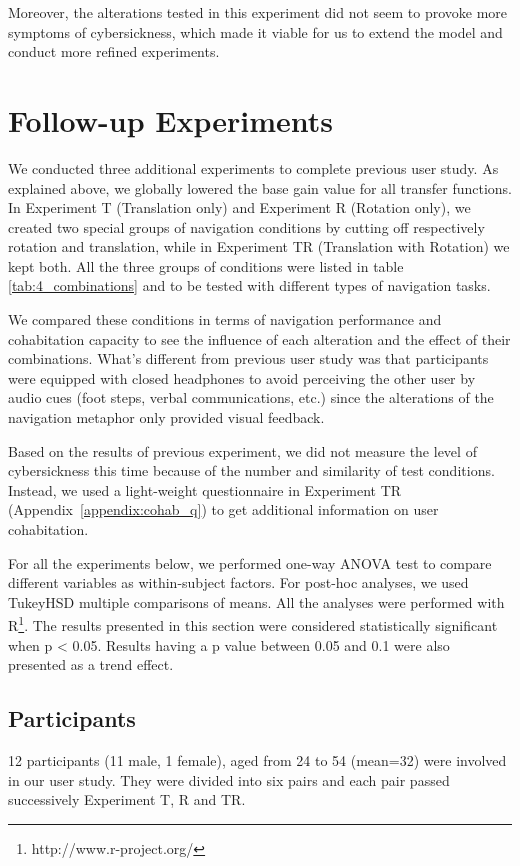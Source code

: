 Moreover, the alterations tested in this experiment did not seem to provoke more symptoms of cybersickness, which made it viable for us to extend the model and conduct more refined experiments.




\section{Follow-up Experiments}
We conducted three additional experiments to complete previous user study. As explained above, we globally lowered the base gain value for all transfer functions. In Experiment T (Translation only) and Experiment R (Rotation only), we created two special groups of navigation conditions by cutting off respectively rotation and translation, while in Experiment TR (Translation with Rotation) we kept both. All the three groups of conditions were listed in table \ref{tab:4_combinations} and to be tested with different types of navigation tasks. 

We compared these conditions in terms of navigation performance and cohabitation capacity to see the influence of each alteration and the effect of their combinations. What's different from previous user study was that participants were equipped with closed headphones to avoid perceiving the other user by audio cues (foot steps, verbal communications, etc.) since the alterations of the navigation metaphor only provided visual feedback.

Based on the results of previous experiment, we did not measure the level of cybersickness this time because of the number and similarity of test conditions. Instead, we used a light-weight questionnaire in Experiment TR (Appendix~\ref{appendix:cohab_q}) to get additional information on user cohabitation.

For all the experiments below, we performed one-way ANOVA test to compare different variables as within-subject factors. For post-hoc analyses, we used TukeyHSD multiple comparisons of means. All the analyses were performed with R\footnote{http://www.r-project.org/}. The results presented in this section were considered statistically significant when p \textless{} 0.05. Results having a p value between 0.05 and 0.1 were also presented as a trend effect.

\subsection{Participants}
12 participants (11 male, 1 female), aged from 24 to 54 (mean=32) were involved in our user study. They were divided into six pairs and each pair passed successively Experiment T, R and TR.


